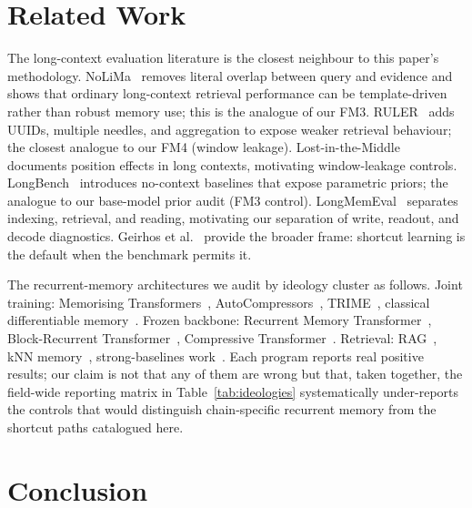 \documentclass{article}
\begin{document}
\section{Related Work}
\label{sec:related}

The long-context evaluation literature is the closest neighbour to
this paper's methodology.  NoLiMa~\cite{nolima2025} removes literal
overlap between query and evidence and shows that ordinary
long-context retrieval performance can be template-driven rather
than robust memory use; this is the analogue of our FM3.
RULER~\cite{ruler2024} adds UUIDs, multiple needles, and aggregation
to expose weaker retrieval behaviour; the closest analogue to our
FM4 (window leakage).  Lost-in-the-Middle~\cite{lostmiddle2024}
documents position effects in long contexts, motivating
window-leakage controls.  LongBench~\cite{longbench2024} introduces
no-context baselines that expose parametric priors; the analogue
to our base-model prior audit (FM3 control).
LongMemEval~\cite{longmemeval2025} separates indexing, retrieval,
and reading, motivating our separation of write, readout, and
decode diagnostics.  Geirhos et al.~\cite{shortcut2020} provide the
broader frame: shortcut learning is the default when the benchmark
permits it.

The recurrent-memory architectures we audit by ideology cluster as
follows.  Joint training: Memorising Transformers~\cite{memorizing2022},
AutoCompressors~\cite{autocompressors2023}, TRIME~\cite{trime2022},
classical differentiable memory~\cite{ntm2014}.  Frozen backbone:
Recurrent Memory Transformer~\cite{rmt2022,armt2024}, Block-Recurrent
Transformer~\cite{blockrecurrent2022}, Compressive
Transformer~\cite{compressive2019}.  Retrieval:
RAG~\cite{ragoriginal2020}, kNN memory~\cite{memorizing2022},
strong-baselines work~\cite{ragbaseline2025}.  Each program reports
real positive results; our claim is not that any of them are wrong
but that, taken together, the field-wide reporting matrix in
Table~\ref{tab:ideologies} systematically under-reports the controls
that would distinguish chain-specific recurrent memory from the
shortcut paths catalogued here.

\section{Conclusion}
\label{sec:conclusion}
\end{document}
